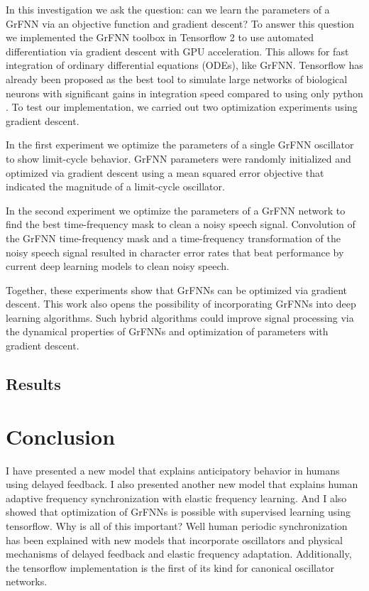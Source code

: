 \documentclass{report}
\begin{document}
In this investigation we ask the question: can we learn the parameters of a GrFNN via an objective function and gradient descent? To answer this question we implemented the GrFNN toolbox in Tensorflow 2 to use automated differentiation via gradient descent with GPU acceleration. This allows for fast integration of ordinary differential equations (ODEs), like GrFNN. Tensorflow has already been proposed as the best tool to simulate large networks of biological neurons with significant gains in integration speed compared to using only python \cite{mohanta2019parallel}. To test our implementation, we carried out two optimization experiments using gradient descent.

In the first experiment we optimize the parameters of a single GrFNN oscillator to show limit-cycle behavior. GrFNN parameters were randomly initialized and optimized via gradient descent using a mean squared error objective that indicated the magnitude of a limit-cycle oscillator.

In the second experiment we optimize the parameters of a GrFNN network to find the best time-frequency mask to clean a noisy speech signal. Convolution of the GrFNN time-frequency mask and a time-frequency transformation of the noisy speech signal resulted in character error rates that beat performance by current deep learning models to clean noisy speech. 

Together, these experiments show that GrFNNs can be optimized via gradient descent. This work also opens the possibility of incorporating GrFNNs into deep learning algorithms. Such hybrid algorithms could improve signal processing via the dynamical properties of GrFNNs and optimization of parameters with gradient descent.

\section{Results}



\chapter{Conclusion}
I have presented a new model that explains anticipatory behavior in humans using delayed feedback. I also presented another new model that explains human adaptive frequency synchronization with elastic frequency learning. And I also showed that optimization of GrFNNs is possible with supervised learning using tensorflow. Why is all of this important? Well human periodic synchronization has been explained with new models that incorporate oscillators and physical mechanisms of delayed feedback and elastic frequency adaptation. Additionally, the tensorflow implementation is the first of its kind for canonical oscillator networks.
\end{document}
